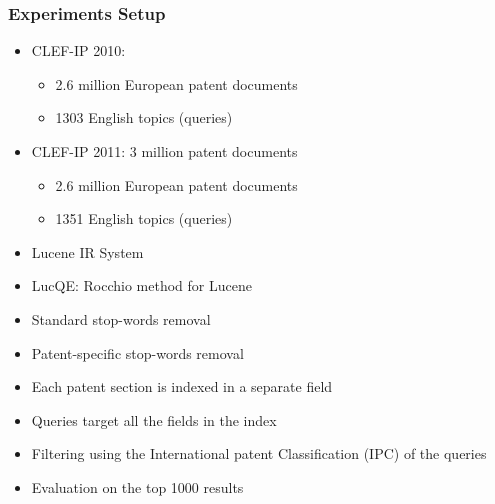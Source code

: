 \documentclass[xcolor=x11names,compress]{beamer}
\renewcommand{\(}{\begin{columns}}
\renewcommand{\)}{\end{columns}}
\newcommand{\<}[1]{\begin{column}{#1}}
\renewcommand{\>}{\end{column}}
\begin{document}
\begin{frame}
\frametitle{Experiments Setup}
\begin{itemize}
\item CLEF-IP 2010: 
	\begin{itemize}
		\item 2.6 million European patent documents
		\item 1303 English topics (queries)
	\end{itemize}
\item CLEF-IP 2011: 3 million patent documents
	\begin{itemize}
		\item 2.6 million European patent documents
		\item 1351 English topics (queries)
	\end{itemize}
\item Lucene IR System
\item LucQE: Rocchio method for Lucene
\item Standard stop-words removal
\item Patent-specific stop-words removal \cite{Magdy2012}
\item Each patent section is indexed in a separate field
\item Queries target all the fields in the index
\item Filtering using the International patent Classification (IPC) of the queries \cite{Lopez2009,Roda2009}
\item Evaluation on the top 1000 results
\end{itemize}

\end{frame}
\end{document}
